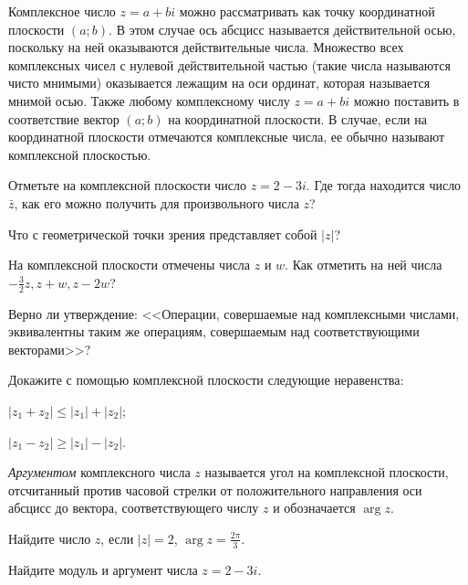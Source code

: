 \documentclass[a4paper, 12pt, num=21]{listok}
\begin{document}
\begin{definition}
	Комплексное число $z = a + bi$ можно рассматривать как точку координатной плоскости $(a; b)$.
	В этом случае ось абсцисс называется действительной осью, поскольку на ней оказываются действительные числа.
	Множество всех комплексных чисел с нулевой действительной частью (такие числа называются чисто мнимыми) оказывается лежащим на оси ординат,
	которая называется мнимой осью.
	Также любому комплексному числу $z = a + bi$ можно поставить в соответствие вектор $(a; b)$ на координатной плоскости.
	В случае, если на координатной плоскости отмечаются комплексные числа, ее обычно называют комплексной плоскостью.
\end{definition}
\begin{problem}
\begin{probparts}
	\item Отметьте на комплексной плоскости число $z = 2 - 3i$. Где тогда находится число $\bar z$,
	как его можно получить для произвольного числа $z$?
	\item Что с геометрической точки зрения представляет собой $|z|$?
	\item На комплексной плоскости отмечены числа $z$ и $w$.
	Как отметить на ней числа $-\frac 32 z, z + w, z - 2w$?
\end{probparts}
\end{problem}
\begin{problem}
	Верно ли утверждение: <<Операции, совершаемые над комплексными числами, эквивалентны таким же операциям, совершаемым над соответствующими векторами>>?
\end{problem}
\begin{problem}
	Докажите с помощью комплексной плоскости следующие неравенства:
	\begin{multienum}{2}
		\item  $|z_1 + z_2| \le |z_1| + |z_2|$;
		\item  $|z_1 - z_2| \ge |z_1| - |z_2|$.
	\end{multienum}
\end{problem}
\begin{definition}
	\textit{Аргументом} комплексного числа $z$ называется угол на комплексной плоскости,
	отсчитанный против часовой стрелки от положительного направления оси абсцисс до вектора,
	соответствующего числу $z$ и обозначается $\arg z$.
\end{definition}
\begin{problem}
\begin{probparts}
	\item Найдите число $z$, если $|z| = 2$, $\arg z = \frac{2\pi}3$.
	\item Найдите модуль и аргумент числа $z = 2 - 3i$.
\end{probparts}
\end{problem}
\end{document}

